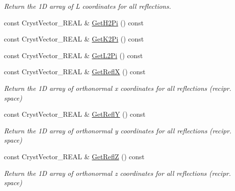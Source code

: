 \begin{DoxyCompactItemize}
\begin{DoxyCompactList}\small\item\em Return the 1D array of L coordinates for all reflections. \end{DoxyCompactList}\item 
const Cryst\+Vector\+\_\+\+R\+E\+AL \& \mbox{\hyperlink{class_obj_cryst_1_1_scattering_data_a22249caed3843cadff97963de59ff444}{Get\+H2\+Pi}} () const
\item 
const Cryst\+Vector\+\_\+\+R\+E\+AL \& \mbox{\hyperlink{class_obj_cryst_1_1_scattering_data_afa7ef198a6e1caeedcc52c2579685dfc}{Get\+K2\+Pi}} () const
\item 
const Cryst\+Vector\+\_\+\+R\+E\+AL \& \mbox{\hyperlink{class_obj_cryst_1_1_scattering_data_a4838871273f014329e9ef55ef088fde4}{Get\+L2\+Pi}} () const
\item 
\mbox{\label{class_obj_cryst_1_1_scattering_data_a5e47cf11f5e2d03707ace6da78384b78}} 
const Cryst\+Vector\+\_\+\+R\+E\+AL \& \mbox{\hyperlink{class_obj_cryst_1_1_scattering_data_a5e47cf11f5e2d03707ace6da78384b78}{Get\+ReflX}} () const
\begin{DoxyCompactList}\small\item\em Return the 1D array of orthonormal x coordinates for all reflections (recipr. space) \end{DoxyCompactList}\item 
\mbox{\label{class_obj_cryst_1_1_scattering_data_ae3b1bb233df72c31b7e5b4f6f6690d38}} 
const Cryst\+Vector\+\_\+\+R\+E\+AL \& \mbox{\hyperlink{class_obj_cryst_1_1_scattering_data_ae3b1bb233df72c31b7e5b4f6f6690d38}{Get\+ReflY}} () const
\begin{DoxyCompactList}\small\item\em Return the 1D array of orthonormal y coordinates for all reflections (recipr. space) \end{DoxyCompactList}\item 
\mbox{\label{class_obj_cryst_1_1_scattering_data_a56a76a1e2d7766e311bbc07e42439921}} 
const Cryst\+Vector\+\_\+\+R\+E\+AL \& \mbox{\hyperlink{class_obj_cryst_1_1_scattering_data_a56a76a1e2d7766e311bbc07e42439921}{Get\+ReflZ}} () const
\begin{DoxyCompactList}\small\item\em Return the 1D array of orthonormal z coordinates for all reflections (recipr. space) \end{DoxyCompactList}\item 

\end{DoxyCompactItemize}
